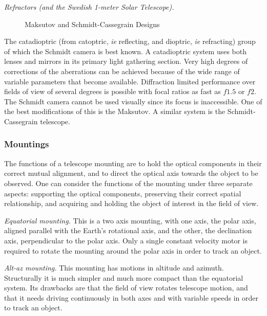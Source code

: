 \documentclass{article}
\begin{document}
{\it Refractors (and the Swedish 1-meter Solar Telescope).}

\begin{figure}[th!]
\hfil{
\hfil
{}
}\hfil
  \caption{Maksutov and Schmidt-Cassegrain Designs}
  \label{fig:catadiotropic}
\end{figure}

The catadioptric (from catoptric, {\it ie} reflecting, and dioptric, {\it ie} 
refracting) group of which the Schmidt camera is best known. A catadioptric 
system uses both lenses and mirrors in its primary light gathering section.
Very high degrees of corrections of the aberrations can be achieved because
of the wide range of variable parameters that become available. Diffraction
limited performance over fields of view of several degrees is possible with
focal ratios as fast as $f1.5$ or $f2$. The Schmidt
camera cannot be used visually since its focus is inaccessible. One of the best
modifications of this is the Maksutov. A similar system is the 
Schmidt-Cassegrain telescope. 

\subsubsection{Mountings}

The functions of a telescope mounting are to hold the optical components 
in their correct mutual alignment, and to direct the optical axis towards the
object to be observed. One can consider the functions of the mounting under 
three separate aspects: supporting the optical components, preserving their 
correct spatial relationship, and acquiring and holding the object of interest 
in the field of view.

\noindent
{\it Equatorial mounting.} This is a two axis mounting, with one axis, the polar axis,
aligned parallel with the Earth's rotational axis, and the other, the declination axis,
perpendicular to the polar axis. Only a single constant velocity motor is required 
to rotate the mounting around the polar axis in order to track an object.

\noindent
{\it Alt-az mounting.} This mounting has motions in altitude and azimuth. Structurally 
it is much simpler and much more compact than the equatorial system. Its drawbacks are 
that the field of view
rotates telescope motion, and that it needs driving continuously in both axes and with 
variable speeds in order to track an object. 
\end{document}
